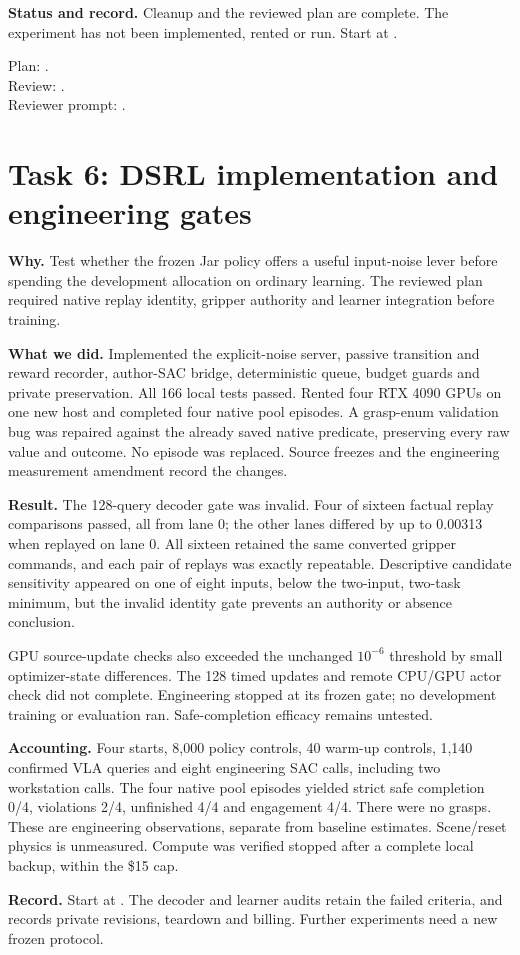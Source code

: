 \documentclass[11pt,a4paper]{article}
\begin{document}
\textbf{Status and record.} Cleanup and the reviewed plan are complete. The experiment has not been implemented, rented or run. Start at .

\noindent Plan: .\\
Review: .\\
Reviewer prompt: .
\newpage
\section*{Task 6: DSRL implementation and engineering gates}

\textbf{Why.} Test whether the frozen Jar policy offers a useful input-noise lever before spending the development allocation on ordinary learning. The reviewed plan required native replay identity, gripper authority and learner integration before training.

\textbf{What we did.} Implemented the explicit-noise server, passive transition and reward recorder, author-SAC bridge, deterministic queue, budget guards and private preservation. All 166 local tests passed. Rented four RTX 4090 GPUs on one new host and completed four native pool episodes. A grasp-enum validation bug was repaired against the already saved native predicate, preserving every raw value and outcome. No episode was replaced. Source freezes and the engineering measurement amendment record the changes.

\textbf{Result.} The 128-query decoder gate was invalid. Four of sixteen factual replay comparisons passed, all from lane 0; the other lanes differed by up to 0.00313 when replayed on lane 0. All sixteen retained the same converted gripper commands, and each pair of replays was exactly repeatable. Descriptive candidate sensitivity appeared on one of eight inputs, below the two-input, two-task minimum, but the invalid identity gate prevents an authority or absence conclusion.

GPU source-update checks also exceeded the unchanged $10^{-6}$ threshold by small optimizer-state differences. The 128 timed updates and remote CPU/GPU actor check did not complete. Engineering stopped at its frozen gate; no development training or evaluation ran. Safe-completion efficacy remains untested.

\textbf{Accounting.} Four starts, 8,000 policy controls, 40 warm-up controls, 1,140 confirmed VLA queries and eight engineering SAC calls, including two workstation calls. The four native pool episodes yielded strict safe completion 0/4, violations 2/4, unfinished 4/4 and engagement 4/4. There were no grasps. These are engineering observations, separate from baseline estimates. Scene/reset physics is unmeasured. Compute was verified stopped after a complete local backup, within the \$15 cap.

\textbf{Record.} Start at . The decoder and learner audits retain the failed criteria, and  records private revisions, teardown and billing. Further experiments need a new frozen protocol.
\end{document}

